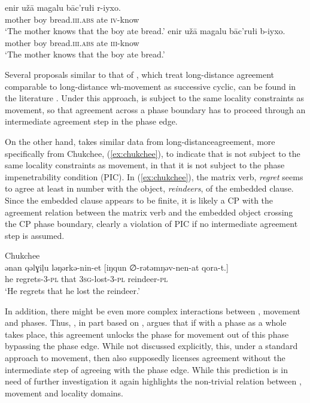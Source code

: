 \documentclass[output=paper
,modfonts
,nonflat]{langsci/langscibook}
\begin{document}
\begin{exe}
	\ex
	\begin{xlist}
		\ex
		\gll enir u\v{z}ā magalu bāc'rułi r-iyxo.\\
		mother boy bread.\textsc{iii.abs} ate \textsc{iv}-know\\
		\glt `The mother knows that the boy ate bread.'
		\ex
		\gll enir u\v{z}ā magalu bāc'rułi b-iyxo.\\
		mother boy bread.\textsc{iii.abs} ate \textsc{iii}-know\\
		\glt `The mother knows that the boy ate bread.'
	\end{xlist}
\end{exe}
Several proposals similar to that of \cite{polinskypotsdam2001}, which treat long-distance agreement comparable to long-distance wh-movement as successive cyclic, can be found in the literature \citep{Legate2005,Frank2006,bjorkmanzeijlstra}.
Under this approach, \agr{} is subject to the same locality constraints as movement, so that agreement across a phase boundary has to proceed through an intermediate agreement step in the phase edge.

On the other hand, \citet{Boskovic2007} takes similar data from long-distance\linebreak agreement, more specifically from Chukchee, (\ref{ex:chukchee}), to indicate that \agr{} is not subject to the same locality constraints as movement, in that it is not subject to the phase impenetrability condition (PIC). In (\ref{ex:chukchee}), the matrix verb, \textit{regret} seems to agree at least in number with the object, \textit{reindeers}, of the embedded clause. Since the embedded clause appears to be finite, it is likely a CP with the agreement relation between the matrix verb and the embedded object crossing the CP phase boundary, clearly a violation of PIC if no intermediate agreement step is assumed.

\begin{exe}
	\ex Chukchee \citep{Boskovic2007}\\
	\gll ənan {qəlɣiļu ləŋərkə-nin-et} [iŋqun ∅-rətəmŋəv-nen-at qora-t.]\\
	he regrets-3-\textsc{pl} that \textsc{3sg}-lost-3-\textsc{pl} reindeer-\textsc{pl}\\
	\glt `He regrets that he lost the reindeer.' \label{ex:chukchee}
\end{exe}
In addition, there might be even more complex interactions between \agr, movement and phases. Thus, \citet{branan2018}, in part based on \citet{rackowskirichards2005}, argues that if \agr{} with a phase as a whole takes place, this agreement unlocks the phase for movement out of this phase bypassing the phase edge.
While not discussed explicitly, this, under a standard approach to movement, then also supposedly licenses agreement without the intermediate step of agreeing with the phase edge. While this prediction is in need of further investigation it again highlights the non-trivial relation between \agr, movement and locality domains.
\end{document}

